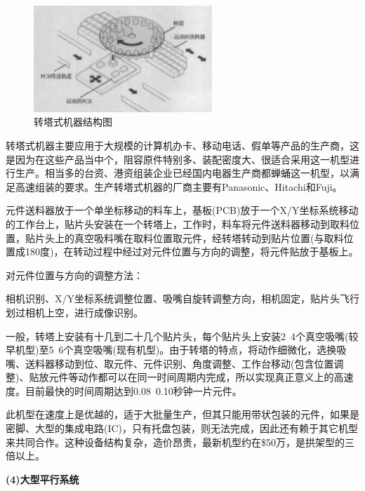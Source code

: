 \documentclass[a4paper]{article}%
\begin{document}
\begin{CJK}{UTF8}{gbsn}
\begin{figure}[htb!]
\centering
\includegraphics[width=0.6\textwidth]{fig304.eps}
\caption{转塔式机器结构图}
\label{fig304}
\end{figure}

转塔式机器主要应用于大规模的计算机办卡、移动电话、假单等产品的生产商，这是因为在这些产品当中个，阻容原件特别多、装配密度大、很适合采用这一机型进行生产。相当多的台资、港资组装企业已经国内电器生产商都蝉蛹这一机型，以满足高速组装的要求。生产转塔式机器的厂商主要有Panasonic、Hitachi和Fuji。

元件送料器放于一个单坐标移动的料车上，基板(PCB)放于一个X/Y坐标系统移动的工作台上，贴片头安装在一个转塔上，工作时，料车将元件送料器移动到取料位置，贴片头上的真空吸料嘴在取料位置取元件，经转塔转动到贴片位置(与取料位置成180度)，在转动过程中经过对元件位置与方向的调整，将元件贴放于基板上。

对元件位置与方向的调整方法：

相机识别、X/Y坐标系统调整位置、吸嘴自旋转调整方向，相机固定，贴片头飞行划过相机上空，进行成像识别。

一般，转塔上安装有十几到二十几个贴片头，每个贴片头上安装2~4个真空吸嘴(较早机型)至5~6个真空吸嘴(现有机型)。由于转塔的特点，将动作细微化，选换吸嘴、送料器移动到位、取元件、元件识别、角度调整、工作台移动(包含位置调整)、贴放元件等动作都可以在同一时间周期内完成，所以实现真正意义上的高速度。目前最快的时间周期达到0.08~0.10秒钟一片元件。

此机型在速度上是优越的，适于大批量生产，但其只能用带状包装的元件，如果是密脚、大型的集成电路(IC)，只有托盘包装，则无法完成，因此还有赖于其它机型来共同合作。这种设备结构复杂，造价昂贵，最新机型约在\$50万，是拱架型的三倍以上。

\textbf{(4)大型平行系统}


\end{CJK}
\end{document}
